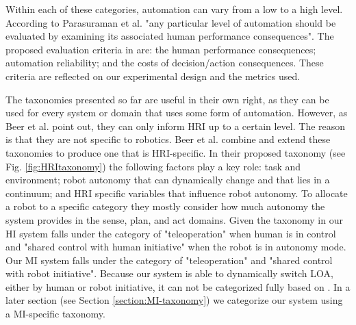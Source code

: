 \documentclass[a4paper,12pt,oneside,openright]{bhamthesis}
\begin{document}
Within each of these categories, automation can vary from a low to a high level. According to Parasuraman et al. \cite{Parasuraman2000} "any particular level of automation should be evaluated by examining its associated human performance consequences". The proposed evaluation criteria in \cite{Parasuraman2000} are: the human performance consequences; automation reliability; and the costs of decision/action consequences. These criteria are reflected on our experimental design and the metrics used.

The taxonomies presented so far are useful in their own right, as they can be used for every system or domain that uses some form of automation. However, as Beer et al.\cite{Beer2014} point out, they can only inform HRI up to a certain level. The reason is that they are not specific to robotics. Beer et al. \cite{Beer2014} combine and extend these taxonomies to produce one that is HRI-specific. In their proposed taxonomy \cite{Beer2014} (see Fig. \ref{fig:HRItaxonomy}) the following factors play a key role: task and environment; robot autonomy that can dynamically change and that lies in a continuum; and HRI specific variables that influence robot autonomy. To allocate a robot to a specific category they mostly consider how much autonomy the system provides in the sense, plan, and act domains. Given the taxonomy in \cite{Beer2014} our HI system falls under the category of "teleoperation" when human is in control and "shared control with human initiative" when the robot is in autonomy mode. Our MI system falls under the category of "teleoperation" and "shared control with robot initiative". Because our system is able to dynamically switch LOA, either by human or robot initiative, it can not be categorized fully based on \cite{Beer2014}. In a later section (see Section \ref{section:MI-taxonomy}) we categorize our system using a MI-specific taxonomy.
\end{document}
